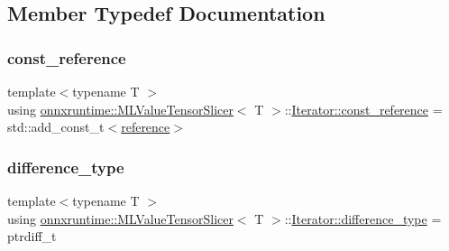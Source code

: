 \subsection{Member Typedef Documentation}
\mbox{\label{classonnxruntime_1_1MLValueTensorSlicer_1_1Iterator_aafbb938cecd84d85c4eef5b9e4332873}} 
\subsubsection{\texorpdfstring{const\+\_\+reference}{const\_reference}}
{\footnotesize\ttfamily template$<$typename T $>$ \\
using \mbox{\hyperlink{classonnxruntime_1_1MLValueTensorSlicer}{onnxruntime\+::\+M\+L\+Value\+Tensor\+Slicer}}$<$ T $>$\+::\mbox{\hyperlink{classonnxruntime_1_1MLValueTensorSlicer_1_1Iterator_aafbb938cecd84d85c4eef5b9e4332873}{Iterator\+::const\+\_\+reference}} =  std\+::add\+\_\+const\+\_\+t$<$\mbox{\hyperlink{classonnxruntime_1_1MLValueTensorSlicer_1_1Iterator_a528f0b8364b23168f0565c1503b44cd0}{reference}}$>$}

\mbox{\label{classonnxruntime_1_1MLValueTensorSlicer_1_1Iterator_a927741252788936cc33b0c46e86ad646}} 
\subsubsection{\texorpdfstring{difference\+\_\+type}{difference\_type}}
{\footnotesize\ttfamily template$<$typename T $>$ \\
using \mbox{\hyperlink{classonnxruntime_1_1MLValueTensorSlicer}{onnxruntime\+::\+M\+L\+Value\+Tensor\+Slicer}}$<$ T $>$\+::\mbox{\hyperlink{classonnxruntime_1_1MLValueTensorSlicer_1_1Iterator_a927741252788936cc33b0c46e86ad646}{Iterator\+::difference\+\_\+type}} =  ptrdiff\+\_\+t}

